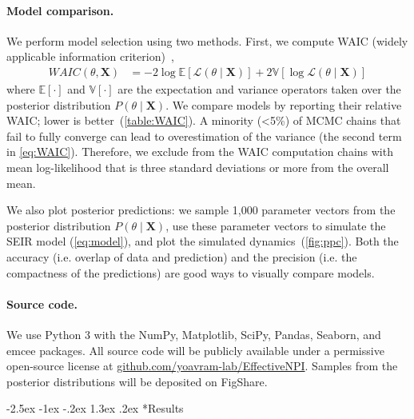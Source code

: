 \documentclass[12pt]{extarticle}
\makeatletter
\renewcommand\section{\@startsection {section}{1}{\z@}%
     {-2.5ex \@plus -1ex \@minus -.2ex}%
     {1.3ex \@plus.2ex}%
    {\Large\bfseries}}
\let\vec\mathbf
\makeatother
\begin{document}
\paragraph*{Model comparison.}
We perform model selection using two methods.
First, we compute WAIC (widely applicable information criterion)~\citep{gelman2013bayesian},
\begin{equation} \label{eq:WAIC}
\begin{aligned}
\mathit{WAIC}(\theta, \vec{X}) &= -2\log\mathbb{E}[\mathcal{L}(\theta \mid \vec{X})] + 2\mathbb{V}[\log\mathcal{L}(\theta \mid \vec{X})]
\end{aligned}
\end{equation}
where $\mathbb{E}[\cdot]$ and $\mathbb{V}[\cdot]$ are the expectation and variance operators taken over the posterior distribution $P(\theta \mid \vec{X})$.
We compare models by reporting their relative WAIC; lower is better~(\autoref{table:WAIC}).
A minority (<5\%) of MCMC chains that fail to fully converge can lead to overestimation of the variance (the second term in \autoref{eq:WAIC}).
Therefore, we exclude from the WAIC computation chains with mean log-likelihood that is three standard deviations or more from the overall mean. %

We also plot posterior predictions: we sample 1,000 parameter vectors from the posterior distribution $P(\theta \mid \vec{X})$, use these parameter vectors to simulate the SEIR model (\autoref{eq:model}), and plot the simulated dynamics~(\autoref{fig:ppc}).
Both the accuracy (i.e. overlap of data and prediction) and the precision (i.e. the compactness of the predictions) are good ways to visually compare models.



\paragraph*{Source code.} 
We use Python 3 with the NumPy, Matplotlib, SciPy, Pandas, Seaborn, and emcee packages.
All source code will be publicly available under a permissive open-source license at \href{http://github.com/yoavram-lab/EffectiveNPI}{github.com/yoavram-lab/EffectiveNPI}.
Samples from the posterior distributions will be deposited on FigShare.



\section*{Results}
\end{document}
